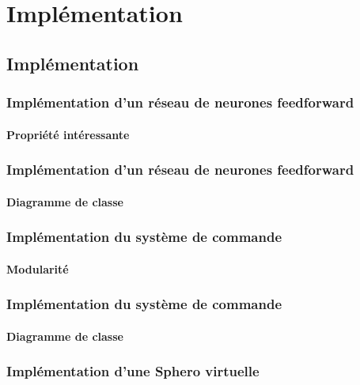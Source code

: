 \section{Implémentation}
\subsection{Implémentation}

\begin{frame}
 \frametitle{Implémentation d'un réseau de neurones feedforward}
 \framesubtitle{Propriété intéressante}
 
\end{frame}

\begin{frame}
 \frametitle{Implémentation d'un réseau de neurones feedforward}
 \framesubtitle{Diagramme de classe}
 
\end{frame}

\begin{frame}
 \frametitle{Implémentation du système de commande}
 \framesubtitle{Modularité}
 
\end{frame}

\begin{frame}
 \frametitle{Implémentation du système de commande}
 \framesubtitle{Diagramme de classe}
 
\end{frame}

\begin{frame}
 \frametitle{Implémentation d'une Sphero virtuelle}

\end{frame}